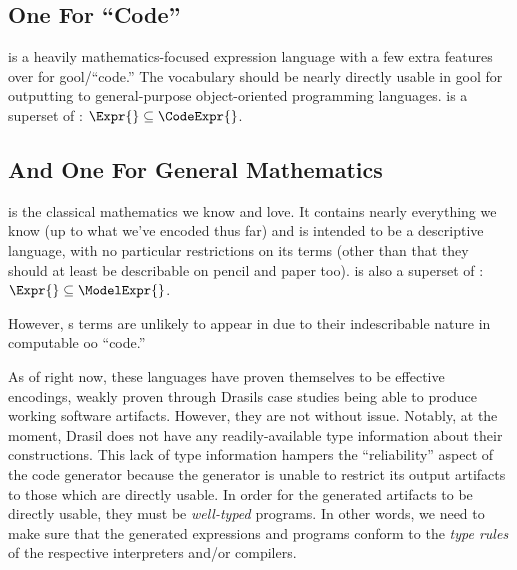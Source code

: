 \subsection{One For \textquotedblleft{}Code\textquotedblright{}}

\CodeExpr{} is a heavily mathematics-focused expression language with a few
extra features over \Expr{} for \acs{gool}/``code.'' The vocabulary should be
nearly directly usable in \acs{gool} for outputting to general-purpose
object-oriented programming languages. \CodeExpr{} is a superset of \Expr{}:
\(\Expr{} \subseteq{} \CodeExpr{}\).

\subsection{And One For General Mathematics}

\ModelExpr{} is the classical mathematics we know and love. It contains nearly
everything we know (up to what we've encoded thus far) and is intended to be a
descriptive language, with no particular restrictions on its terms (other than
that they should at least be describable on pencil and paper too). \ModelExpr{}
is also a superset of \Expr{}: \(\Expr{} \subseteq{} \ModelExpr{}\).

However, \ModelExpr{}s terms are unlikely to appear in \CodeExpr{} due to their
indescribable nature in computable \acs{oo} ``code.''

As of right now, these languages have proven themselves to be effective
encodings, weakly proven through Drasils case studies being able to produce
working software artifacts. However, they are not without issue. Notably, at the
moment, Drasil does not have any readily-available type information about their
constructions. This lack of type information hampers the ``reliability'' aspect
of the code generator because the generator is unable to restrict its output
artifacts to those which are directly usable. In order for the generated
artifacts to be directly usable, they must be \textit{well-typed} programs. In
other words, we need to make sure that the generated expressions and programs
conform to the \textit{type rules} of the respective interpreters and/or
compilers.
